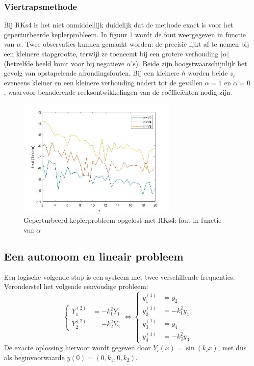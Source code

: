 \documentclass[12pt]{article}
\begin{document}
\subsubsection{Viertrapsmethode}
Bij RKs4 is het niet onmiddellijk duidelijk dat de methode exact is voor het geperturbeerde keplerprobleem. In figuur \ref{fig:pertkepleralphasrks4} wordt de fout weergegeven in functie van \(\alpha\). Twee observaties kunnen gemaakt worden: de precisie lijkt af te nemen bij een kleinere stapgrootte, terwijl ze toeneemt bij een grotere verhouding \(|\alpha|\) (hetzelfde beeld komt voor bij negatieve \(\alpha\)'s). Beide zijn hoogstwaarschijnlijk het gevolg van opstapelende afrondingsfouten. Bij een kleinere \(h\) worden beide \(z_i\) eveneens kleiner en een kleinere verhouding nadert tot de gevallen \(\alpha=1\) en \(\alpha=0\), waarvoor benaderende reeksontwikkelingen van de coëfficiënten nodig zijn. 
\begin{figure}[H]
    \centering
    \includegraphics[width=0.7\textwidth]{pert_kepler_RKs4.jpg}
    \caption{Geperturbeerd keplerprobleem opgelost met RKs4: fout in functie van \(\alpha\)}
    \label{fig:pertkepleralphasrks4}
\end{figure}

\subsection{Een autonoom en lineair probleem}
Een logische volgende stap is een systeem met twee verschillende frequenties. Veronderstel het volgende eenvoudige probleem:
\begin{equation} \label{eq:simplesys}
    \begin{cases}
        Y_1^{(2)}&=-k_1^2Y_1 \\
        Y_2^{(2)}&=-k_2^2Y_2
    \end{cases}\Leftrightarrow
    \begin{cases}
        y_1^{(1)}&=y_2 \\
        y_2^{(1)}&=-k_1^2y_1 \\
        y_3^{(1)}&=y_4 \\
        y_4^{(1)}&=-k_2^2y_3
    \end{cases}
\end{equation}
De exacte oplossing hiervoor wordt gegeven door \(Y_i(x)=\sin(k_ix)\), met dus als beginvoorwaarde \(y(0)=(0,k_1,0,k_2)\). 
\end{document}
